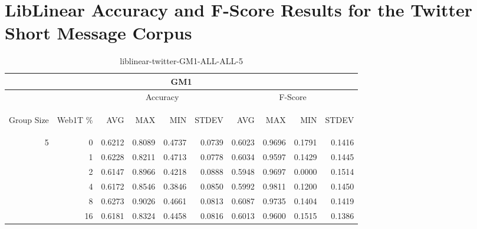 \chapter{LibLinear Accuracy and F-Score Results for the Twitter Short Message Corpus}

\begin{center}
\begin{table}[htbp]
\begin{tabular}{ | r | r | r | r | r | r | r | r | r | r |}
\hline
\multicolumn{10}{|c|}{GM1}\\
\hline
 & & \multicolumn{4}{|c|}{Accuracy} & \multicolumn{4}{|c|}{F-Score}\\ \cline{3-10}
\begin{sideways}Group Size\end{sideways} & \begin{sideways}Web1T \%\end{sideways} & \begin{sideways}AVG\end{sideways} & \begin{sideways}MAX\end{sideways} & \begin{sideways}MIN\end{sideways} & \begin{sideways}STDEV\end{sideways} & \begin{sideways}AVG\end{sideways} & \begin{sideways}MAX\end{sideways} & \begin{sideways}MIN\end{sideways} & \begin{sideways}STDEV\end{sideways}\\
\hline
\multirow{5}{*}{5}
 & 0 & 0.6212 & 0.8089 & 0.4737 & 0.0739 & 0.6023 & 0.9696 & 0.1791 & 0.1416\\ \cline{2-10}
 & 1 & 0.6228 & 0.8211 & 0.4713 & 0.0778 & 0.6034 & 0.9597 & 0.1429 & 0.1445\\ \cline{2-10}
 & 2 & 0.6147 & 0.8966 & 0.4218 & 0.0888 & 0.5948 & 0.9697 & 0.0000 & 0.1514\\ \cline{2-10}
 & 4 & 0.6172 & 0.8546 & 0.3846 & 0.0850 & 0.5992 & 0.9811 & 0.1200 & 0.1450\\ \cline{2-10}
 & 8 & 0.6273 & 0.9026 & 0.4661 & 0.0813 & 0.6087 & 0.9735 & 0.1404 & 0.1419\\ \cline{2-10}
 & 16 & 0.6181 & 0.8324 & 0.4458 & 0.0816 & 0.6013 & 0.9600 & 0.1515 & 0.1386\\ \cline{2-10}
\hline
\end{tabular}
\caption{liblinear-twitter-GM1-ALL-ALL-5}
\label{table:liblinear-twitter-GM1-ALL-ALL-5}
\end{table}
\end{center}

